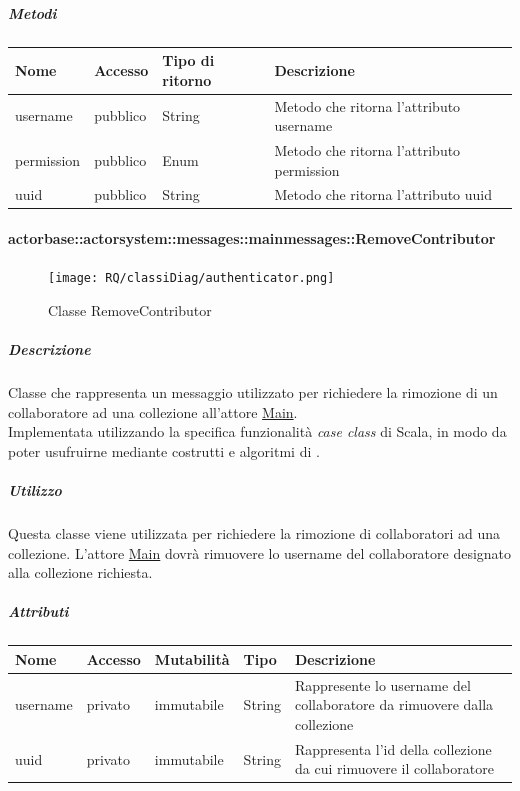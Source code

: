 \documentclass{scalatekids-article}
\begin{document}
\subparagraph{Metodi}
\begin{tabular}{| l | l | l | l |}
  \hline
  Nome & Accesso & Tipo di ritorno & Descrizione\\
  \hline
  username & pubblico & String & Metodo che ritorna l'attributo username\\
  \hline
  permission & pubblico & Enum & Metodo che ritorna l'attributo permission\\
  \hline
  uuid & pubblico & String & Metodo che ritorna l'attributo uuid\\
  \hline
\end{tabular}

\paragraph{actorbase::actorsystem::messages::mainmessages::RemoveContributor}
\label{sec:actorbase::actorsystem::messages::mainmessages::RemoveContributor}

\begin{figure}[H]
  \begin{center}
    \texttt{[image: RQ/classiDiag/authenticator.png]}
    \caption{Classe RemoveContributor}
  \end{center}
\end{figure}

\subparagraph{Descrizione}
Classe che rappresenta un messaggio utilizzato per richiedere la rimozione di un
collaboratore ad una collezione all'attore \hyperref[sec:actorbase::actorsystem::actors::main::Main]{Main}.\\Implementata
utilizzando la specifica funzionalità \textit{case class} di Scala, in modo da poter usufruirne mediante costrutti e algoritmi di
.

\subparagraph{Utilizzo}
Questa classe viene utilizzata per richiedere la rimozione di collaboratori ad
una collezione. L'attore
\hyperref[sec:actorbase::actorsystem::actors::main::Main]{Main} dovrà rimuovere
lo username del collaboratore designato alla collezione richiesta.

\subparagraph{Attributi}
\begin{tabular}{| p{2cm} | p{1.5cm} | p{2cm} | p{3cm} | p{8.5cm} |}
  \hline
  Nome & Accesso & Mutabilità & Tipo & Descrizione\\
  \hline
  username & privato & immutabile & String & Rappresente lo username del collaboratore da rimuovere dalla collezione\\
  \hline
  uuid & privato & immutabile & String & Rappresenta l'id della collezione da cui rimuovere il collaboratore\\
  \hline
\end{tabular}
\end{document}
